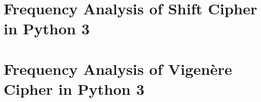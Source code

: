 \documentclass[12pt]{article}
\begin{document}
\newpage


\newpage
\appendix

\section{Frequency Analysis of Shift Cipher in Python 3}



\newpage
\section{Frequency Analysis of Vigen\`{e}re Cipher in Python 3}


\end{document}
